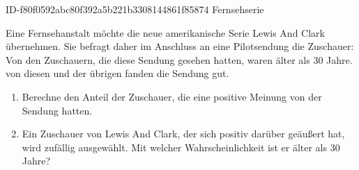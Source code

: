 \begin{exercise}
      {ID-f80f0592abc80f392a5b221b3308144861f85874}
      {Fernsehserie}
  \ifproblem\problem\par
    Eine Fernsehanstalt möchte die neue amerikanische Serie \glqq Lewis And Clark\grqq{}
    übernehmen. Sie befragt daher im Anschluss an eine Pilotsendung die Zuschauer:
    Von den Zuschauern, die diese Sendung gesehen hatten, waren  älter als
    30 Jahre.  von diesen und  der übrigen fanden die Sendung gut.
    \begin{enumerate}
      \item Berechne den Anteil der Zuschauer, die eine positive Meinung
            von der Sendung hatten.
      \item Ein Zuschauer von \glqq Lewis And Clark\grqq, der sich positiv
            darüber geäußert hat, wird zufällig ausgewählt. Mit welcher
            Wahrscheinlichkeit ist er älter als 30 Jahre?
    \end{enumerate}
  \fi
\end{exercise}
